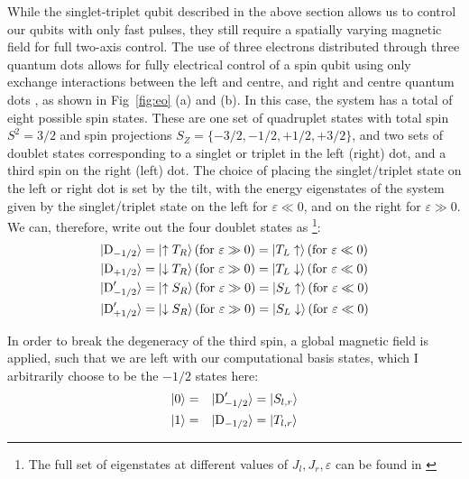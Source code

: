 While the singlet-triplet qubit described in the above section allows us to control our qubits with only fast pulses, they still require
a spatially varying magnetic field for full two-axis control. The use of three electrons distributed through three quantum dots allows
for fully electrical control of a spin qubit using only exchange interactions between the left and centre, and right and centre quantum
dots \cite{10.1038-35042541}, as shown in Fig~\ref{fig:eo} (a) and (b). In this case, the system has a total of eight possible spin states. These
are one set of quadruplet states with total spin $S^2 = 3/2$ and spin projections $S_Z = \{-3/2, -1/2, +1/2, +3/2\}$, and two sets of doublet
states corresponding to a singlet or triplet in the left (right) dot, and a third spin on the right (left) dot. The choice of placing the singlet/triplet
state on the left or right dot is set by the tilt, with the energy eigenstates of the system given by the singlet/triplet state on the left for $\varepsilon \ll 0$,
and on the right for $\varepsilon \gg 0$. We can, therefore, write out the four doublet states as
\footnote{The full set of eigenstates at different values of $J_l, J_r, \varepsilon$ can be found in \cite{PhysRevB.82.075403}}:
\begin{equation}
\begin{split}
  \ket{\textrm{D}_{-1/2}}        &= \ket{\uparrow T_R}   (\textrm{for }\varepsilon \gg 0) = \ket{T_L\uparrow}   (\textrm{for }\varepsilon \ll 0)\\
  \ket{\textrm{D}_{+1/2}}        &= \ket{\downarrow T_R} (\textrm{for }\varepsilon \gg 0) = \ket{T_L\downarrow} (\textrm{for }\varepsilon \ll 0)\\
  \ket{\textrm{D}^\prime_{-1/2}} &= \ket{\uparrow S_R}   (\textrm{for }\varepsilon \gg 0) = \ket{S_L\uparrow}   (\textrm{for }\varepsilon \ll 0)\\
  \ket{\textrm{D}^\prime_{+1/2}} &= \ket{\downarrow S_R} (\textrm{for }\varepsilon \gg 0) = \ket{S_L\downarrow} (\textrm{for }\varepsilon \ll 0)\\
\end{split}
\end{equation}

In order to break the degeneracy of the third spin, a global magnetic field is applied, such that we are left with our computational basis states, which
I arbitrarily choose to be the $-1/2$ states here:
\begin{alignat}{2}
  \ket{0} &=& \ket{\textrm{D}^\prime_{-1/2}} &= \ket{S_{l,r}} \\
  \ket{1} &=& \ket{\textrm{D}_{-1/2}} &= \ket{T_{l,r}}
\end{alignat}

